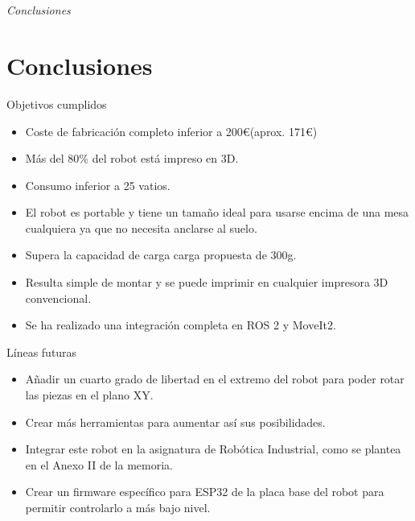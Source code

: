 \documentclass{beamer}
\begin{document}
\section*{}
\begin{frame}{}
  \centering \Huge
  \emph{Conclusiones}
\end{frame}

\section{Conclusiones}

\begin{frame}
\begin{block}{Objetivos cumplidos}
\begin{itemize}
\item Coste de fabricación completo inferior a 200\euro\xspace(aprox. 171\euro)
\item Más del 80\% del robot está impreso en 3D.
\item Consumo inferior a 25 vatios.
\item El robot es portable y tiene un tamaño ideal para usarse encima de una mesa cualquiera ya que no necesita anclarse al suelo.
\item Supera la capacidad de carga carga propuesta de 300g.
\item Resulta simple de montar y se puede imprimir en cualquier impresora 3D convencional.
\item Se ha realizado una integración completa en ROS 2 y MoveIt2.
\end{itemize}
\end{block}
\end{frame}

\begin{frame}
\begin{block}{Líneas futuras}
  \begin{itemize}
  \item Añadir un cuarto grado de libertad en el extremo del robot para poder rotar las piezas en el plano XY.
  \item Crear más herramientas para aumentar así sus posibilidades.
  \item Integrar este robot en la asignatura de Robótica Industrial, como se plantea en el Anexo II de la memoria.
  \item Crear un firmware específico para ESP32 de la placa base del robot para permitir controlarlo a más bajo nivel.
  \end{itemize}
  \end{block}
\end{frame}

\begin{frame}[plain]
\large{\titlepage}
\end{frame}
\end{document}

